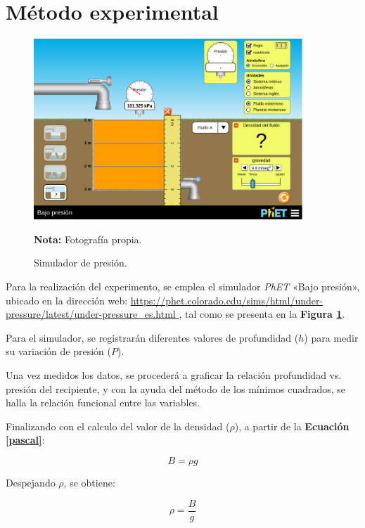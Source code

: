 \documentclass[letter,11pt]{article}
\newcommand{\source}[1]{\vspace{-11pt} \caption*{\small{\textbf{Nota:} {#1}}}}
\begin{document}
\section{Método experimental}

\begin{figure}
\centering
\includegraphics[width=0.90\textwidth]{resources/f2.eps}
\caption{Simulador de presión.}
\label{figura2}
\source{Fotografía propia.}
\end{figure}

Para la realización del experimento, se emplea el simulador \emph{PhET} «Bajo
presión», ubicado en la dirección web: \url{
https://phet.colorado.edu/sims/html/under-pressure/latest/under-pressure_es.html
}, tal como se presenta en la \textbf{Figura \ref{figura2}}.

Para el simulador, se registrarán diferentes valores de profundidad ($h$) para
medir su variación de presión ($P$).

Una vez medidos los datos, se procederá a graficar la relación profundidad vs.
presión del recipiente, y con la ayuda del método de los mínimos cuadrados, se
halla la relación funcional entre las variables.

Finalizando con el calculo del valor de la densidad ($\rho$), a partir de la
\textbf{Ecuación \ref{pascal}}:

\begin{equation*}
    B = \rho g
\end{equation*}
\vspace{0.10cm}

Despejando $\rho$, se obtiene:

\begin{equation}
    \rho = \frac{B}{g}
\label{densidad}
\end{equation}
\vspace{0.10cm}
\end{document}
